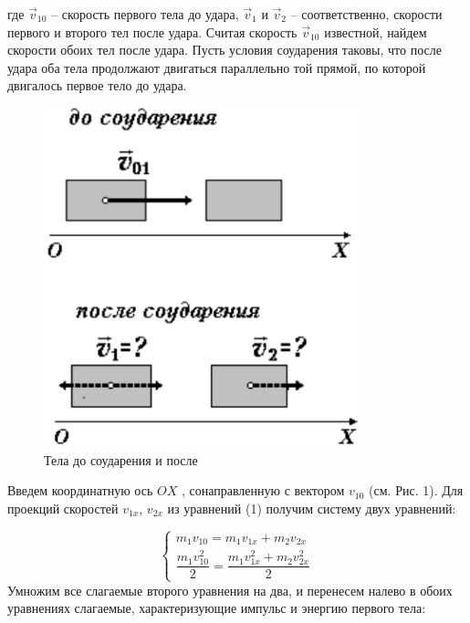 \documentclass[a4paper]{article}
\begin{document}
где $\vec v_{10}$ – скорость первого тела до удара, $\vec v_1$ и $\vec v_2$ – соответственно,
скорости первого и второго тел после удара. Считая скорость $\vec v_{10}$
известной, найдем скорости обоих тел после удара. Пусть условия
соударения таковы, что после удара оба тела продолжают двигаться параллельно той прямой, по которой двигалось первое тело до удара.
\begin{figure}[H]
\begin{center}
\includegraphics[scale=0.5]{pick1.png}
\caption {Тела до соударения и после}
\end{center}
\end{figure}
Введем координатную ось $OX$ , сонаправленную с вектором $v_{10}$
(см. Рис. 1). Для проекций скоростей $v_{1x}$, $v_{2x}$ из уравнений (1)
получим систему двух уравнений:

\begin{equation}
	\begin{cases}
		m_1v_{10}=m_1v_{1x}+m_2v_{2x}\\
		\dfrac{m_1v^2_{10}}{2}=\dfrac{m_1v^2_{1x}+m_2v^2_{2x}}{2}
	\end{cases}
\end{equation}
Умножим все слагаемые второго уравнения на два, и перенесем
налево в обоих уравнениях слагаемые, характеризующие импульс и
энергию первого тела:
\end{document}
